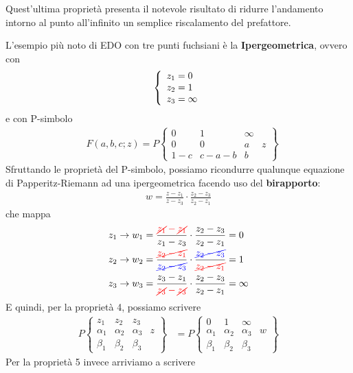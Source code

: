 Quest'ultima proprietà presenta il notevole risultato di ridurre l'andamento intorno al punto all'infinito un semplice riscalamento del prefattore.

\newpage
{}
L'esempio più noto di EDO con tre punti fuchsiani è la \textbf{Ipergeometrica}, ovvero con
\begin{align}
	\triple{z_1 = 0\hfill}{z_2 = 1\hfill}{z_3 = \infty}
\end{align}
e con P-simbolo
\begin{align}
	&F(a,b,c;z)=P\left\{\begin{matrix}
		0 & 1 & \infty & \\
		0 & 0 & a& z\\
		1-c & c-a-b & b & 
	\end{matrix}\right\}
\end{align}
Sfruttando le proprietà del P-simbolo, possiamo ricondurre qualunque equazione di Papperitz-Riemann ad una ipergeometrica facendo uso del \textbf{birapporto}:
\begin{align}
	w = \frac{z-z_1}{z-z_3}\cdot\frac{z_2-z_3}{z_2-z_1}
\end{align}
che mappa
\begin{align}
	&z_1 \to w_1 = \frac{\textcolor{red}{\cancel{z_1}-\cancel{z_1}}}{z_1-z_3}\cdot\frac{z_2-z_3}{z_2-z_1} = 0\\
	&z_2 \to w_2 = \frac{\textcolor{red}{\cancel{z_2-z_1}}}{\textcolor{blue}{\cancel{z_2-z_3}}}\cdot\frac{\textcolor{blue}{\cancel{z_2-z_3}}}{\textcolor{red}{\cancel{z_2-z_1}}} = 1\\
	&z_3 \to w_3 = \frac{z_3-z_1}{\textcolor{red}{\cancel{z_3}-\cancel{z_3}}}\cdot\frac{z_2-z_3}{z_2-z_1} = \infty
\end{align}
E quindi, per la proprietà 4, possiamo scrivere
\begin{align}
	P\left\{\begin{matrix}
			z_1 & z_2 & z_3 & \\
			\alpha_1 & \alpha_2 & \alpha_3& z\\
			\beta_1 & \beta_2 & \beta_3 & 
		\end{matrix}\right\} &=P\left\{\begin{matrix}
		0 & 1 & \infty & \\
		\alpha_1 & \alpha_2 & \alpha_3& w\\
		\beta_1 & \beta_2 & \beta_3 & 
	\end{matrix}\right\} 
\end{align}
Per la proprietà 5 invece arriviamo a scrivere

